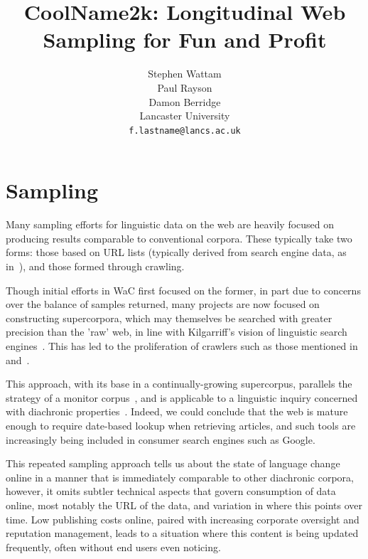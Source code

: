 \documentclass[11pt]{article}
\title{CoolName2k: Longitudinal Web Sampling for Fun and Profit}
\author{Stephen Wattam \\\And
  Paul Rayson\\\And
  Damon Berridge\\\AND
  Lancaster University\\
  {\tt f.lastname@lancs.ac.uk}\\
}
\date{}
\begin{document}
\maketitle

\section{Sampling}

Many sampling efforts for linguistic data on the web are heavily focused on producing results comparable to conventional corpora.  These typically take two forms: those based on URL lists (typically derived from search engine data, as in~\cite{sharoff2006creating}), and those formed through crawling.

Though initial efforts in WaC first focused on the former, in part due to concerns over the balance of samples returned, many projects are now focused on constructing supercorpora, which may themselves be searched with greater precision than the 'raw' web, in line with Kilgarriff's vision of linguistic search engines~\cite{kilgarriff2003linguistic}.  This has led to the proliferation of crawlers such as those mentioned in~\cite{schafer8building} and~\cite{renouf2003webcorp}.


This approach, with its base in a continually-growing supercorpus, parallels the strategy of a monitor corpus~\cite{sinclair1982monitor}, and is applicable to a linguistic inquiry concerned with diachronic properties~\cite{kehoe2006diachronic}.  Indeed, we could conclude that the web is mature enough to require date-based lookup when retrieving articles, and such tools are increasingly being included in consumer search engines such as Google.

This repeated sampling approach tells us about the state of language change online in a manner that is immediately comparable to other diachronic corpora, however, it omits subtler technical aspects that govern consumption of data online, most notably the URL of the data, and variation in where this points over time.  Low publishing costs online, paired with increasing corporate oversight and reputation management, leads to a situation where this content is being updated frequently, often without end users even noticing.
\end{document}
